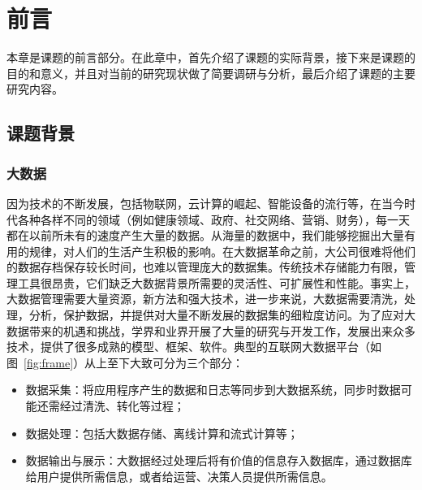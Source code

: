 
\chapter{前言}
\label{chp:intro}

本章是课题的前言部分。在此章中，首先介绍了课题的实际背景，接下来是课题的目的和意义，并且对当前的研究现状做了简要调研与分析，最后介绍了课题的主要研究内容。

\section{课题背景}

\subsection{大数据}

\par 因为技术的不断发展，包括物联网，云计算的崛起\cite{botta2016integration}、智能设备的流行等，在当今时代各种各样不同的领域（例如健康领域、政府、社交网络、营销、财务），每一天都在以前所未有的速度产生大量的数据\cite{oussous2018big}。从海量的数据中，我们能够挖掘出大量有用的规律，对人们的生活产生积极的影响。在大数据革命之前，大公司很难将他们的数据存档保存较长时间，也难以管理庞大的数据集。传统技术存储能力有限，管理工具很昂贵，它们缺乏大数据背景所需要的灵活性、可扩展性和性能。事实上，大数据管理需要大量资源，新方法和强大技术，进一步来说，大数据需要清洗，处理，分析，保护数据，并提供对大量不断发展的数据集的细粒度访问\cite{oussous2018big}。为了应对大数据带来的机遇和挑战，学界和业界开展了大量的研究与开发工作，发展出来众多技术，提供了很多成熟的模型、框架、软件。典型的互联网大数据平台（如图~\ref{fig:frame}）从上至下大致可分为三个部分：

\begin{itemize}
	\item 数据采集：将应用程序产生的数据和日志等同步到大数据系统，同步时数据可能还需经过清洗、转化等过程；
	\item 数据处理：包括大数据存储、离线计算和流式计算等；
	\item 数据输出与展示：大数据经过处理后将有价值的信息存入数据库，通过数据库给用户提供所需信息，或者给运营、决策人员提供所需信息。
\end{itemize}

